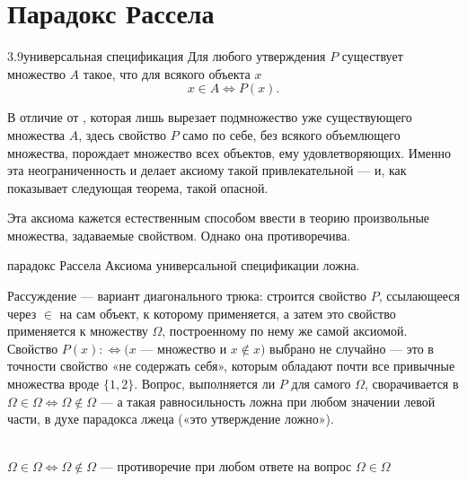 \section{Парадокс Рассела}

\begin{axiom}{3.9}{универсальная спецификация}
Для любого утверждения $P$ существует множество $A$ такое, что для всякого объекта $x$
\[
  x \in A \iff P(x).
\]
\end{axiom}

\begin{intuition}
В отличие от , которая лишь вырезает подмножество
уже существующего множества $A$, здесь свойство $P$ само по себе, без всякого объемлющего
множества, порождает множество всех объектов, ему удовлетворяющих. Именно эта неограниченность
и делает аксиому такой привлекательной — и, как показывает следующая теорема, такой опасной.
\end{intuition}

Эта аксиома кажется естественным способом ввести в теорию произвольные множества, задаваемые
свойством. Однако она противоречива.

\begin{theorem*}{парадокс Рассела}
Аксиома универсальной спецификации ложна.
\end{theorem*}

\begin{intuition}
Рассуждение — вариант диагонального трюка: строится свойство $P$, ссылающееся через $\in$ на
сам объект, к которому применяется, а затем это свойство применяется к множеству $\Omega$,
построенному по нему же самой аксиомой. Свойство $P(x) :\iff (x$ — множество и $x \notin x)$
выбрано не случайно — это в точности свойство «не содержать себя», которым обладают почти все
привычные множества вроде $\{1,2\}$. Вопрос, выполняется ли $P$ для самого $\Omega$,
сворачивается в $\Omega \in \Omega \iff \Omega \notin \Omega$ — а такая равносильность
ложна при любом значении левой части, в духе парадокса лжеца («это утверждение ложно»).

\begin{center}
\\
{\footnotesize\color{intuitiongray}$\Omega \in \Omega \iff \Omega \notin \Omega$ — противоречие
при любом ответе на вопрос $\Omega \in \Omega$}
\end{center}
\end{intuition}

